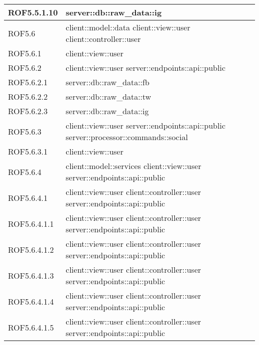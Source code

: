\begin{center}
\begin{longtable}{| p{4cm} | p{8cm} |}
\hline
ROF5.5.1.10 & server::db::raw\_data::ig \\
\hline
ROF5.6 & client::model::data \newline client::view::user \newline client::controller::user \\
\hline
ROF5.6.1 & client::view::user \\
\hline
ROF5.6.2 & client::view::user \newline server::endpoints::api::public \\
\hline
ROF5.6.2.1 & server::db::raw\_data::fb \\
\hline
ROF5.6.2.2 & server::db::raw\_data::tw \\
\hline
ROF5.6.2.3 & server::db::raw\_data::ig \\
\hline
ROF5.6.3 & client::view::user \newline server::endpoints::api::public \newline server::processor::commands::social \\
\hline
ROF5.6.3.1 & client::view::user \\
\hline
ROF5.6.4 & client::model::services \newline client::view::user \newline server::endpoints::api::public \\
\hline
ROF5.6.4.1 & client::view::user \newline client::controller::user \newline server::endpoints::api::public \\
\hline
ROF5.6.4.1.1 & client::view::user \newline client::controller::user \newline server::endpoints::api::public \\
\hline
ROF5.6.4.1.2 & client::view::user \newline client::controller::user \newline server::endpoints::api::public \\
\hline
ROF5.6.4.1.3 & client::view::user \newline client::controller::user \newline server::endpoints::api::public \\
\hline
ROF5.6.4.1.4 & client::view::user \newline client::controller::user \newline server::endpoints::api::public \\
\hline
ROF5.6.4.1.5 & client::view::user \newline client::controller::user \newline server::endpoints::api::public \\

\end{longtable}
\end{center}
